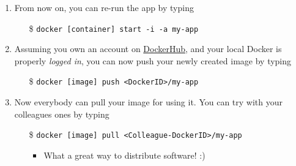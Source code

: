 \documentclass[presentation]{beamer}\mode<presentation>{\usetheme{AMSBolognaFC}}
\begin{document}
\begin{frame}[allowframebreaks]
\begin{enumerate}
        \framebreak

        \item From now on, you can re-run the app by typing
        \begin{itemize}
            \item[\$] \texttt{docker [container] \alert{start} -i -a my-app}
        \end{itemize}

        \item Assuming you own an account on \href{https://hub.docker.com/}{DockerHub}, and your local Docker is properly \emph{logged in}, you can now \alert{push} your newly created image by typing
        \begin{itemize}
            \item[\$] \texttt{docker [image] \alert{push} <DockerID>/my-app}
        \end{itemize}

        \item Now everybody can \alert{pull} your image for using it. You can try with your colleagues ones by typing
        \begin{itemize}
            \item[\$] \texttt{docker [image] \alert{pull} <Colleague-DockerID>/my-app}
            \begin{itemize}
                \item What a great way to distribute software! :)
            \end{itemize}
        \end{itemize}

    \end{enumerate}

\end{frame}

%
%
%
%
%
\end{document}
